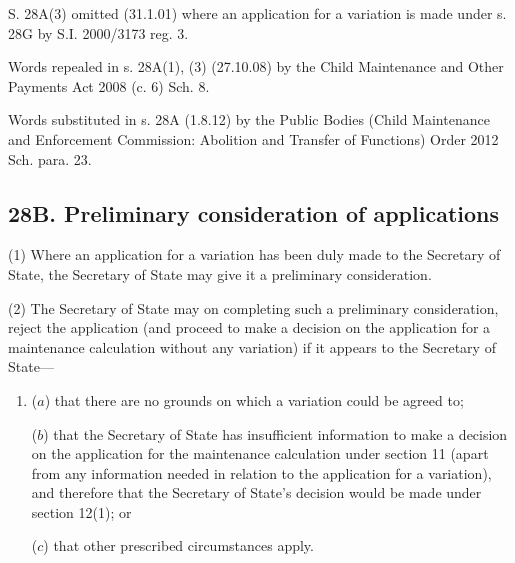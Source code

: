 \documentclass[12pt,a4paper]{article}
\begin{document}
{{S. 28A(3) omitted (31.1.01) where an application for a variation is made under s. 28G by S.I. 2000/3173 reg. 3.

Words repealed in s. 28A(1), (3) (27.10.08) by the Child Maintenance and Other Payments Act 2008 (c. 6) Sch. 8.

Words substituted in s. 28A (1.8.12) by the Public Bodies (Child Maintenance and Enforcement Commission: Abolition and Transfer of Functions) Order 2012 Sch. para. 23.
}

\subsection{28B. Preliminary consideration of applications}

(1) Where an application for a variation has been duly made to the Secretary of State, the Secretary of State may give it a preliminary consideration.

(2) The Secretary of State may on completing such a preliminary consideration, reject the application (and proceed to make a decision on the application for a maintenance calculation without any variation) if it appears to the Secretary of State---
\begin{enumerate}\item[]
($a$) that there are no grounds on which a variation could be agreed to;

($b$) that the Secretary of State has insufficient information to make a decision on the application for the maintenance calculation under section 11 (apart from any information needed in relation to the application for a variation), and therefore that the Secretary of State's decision would be made under section 12(1); or

($c$) that other prescribed circumstances apply.
\end{enumerate}

}
\end{document}
